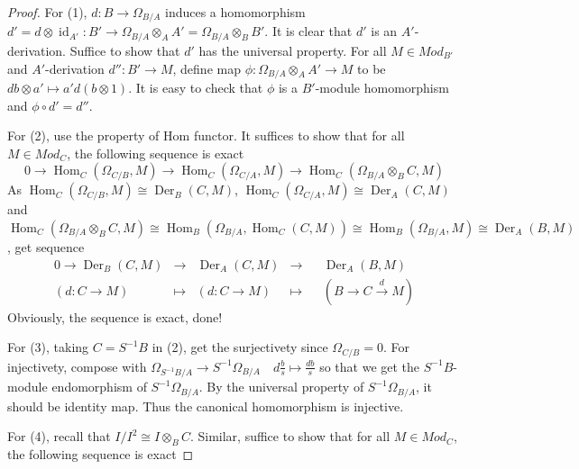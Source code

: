 \documentclass{ctexart}
\renewcommand{\hom}{\operatorname{Hom}}
\newcommand{\identity}{\operatorname{id}}
\newcommand{\derivation}{\operatorname{Der}}
\begin{document}
\begin{proof}
    For (1), $d: B \longrightarrow \Omega_{B/A}$ induces a homomorphism $d' = d \otimes \identity_{A'}: B' \longrightarrow \Omega_{B/A} \otimes_{A} A' = \Omega_{B/A} \otimes_{B} B'$.
    It is clear that $d'$ is an $A'$-derivation.
    Suffice to show that $d'$ has the universal property.
    For all $M\in Mod_{B'}$ and $A'$-derivation $d'': B' \longrightarrow M$, define map $\phi: \Omega_{B/A} \otimes_{A} A' \longrightarrow M$ to be $db \otimes a' \longmapsto a'd(b \otimes 1)$.
    It is easy to check that $\phi$ is a $B'$-module homomorphism and $\phi \circ d' = d''$.
    \par
    For (2), use the property of Hom functor.
    It suffices to show that for all $M\in Mod_{C}$, the following sequence is exact
    \begin{equation*}
        0 \longrightarrow \hom_{C}(\Omega_{C/B}, M) \longrightarrow \hom_{C}(\Omega_{C/A}, M) \longrightarrow \hom_{C}(\Omega_{B/A} \otimes_{B} C, M)
    \end{equation*}
    As $\hom_{C}(\Omega_{C/B}, M) \cong \derivation_{B}(C, M)$, $\hom_{C}(\Omega_{C/A}, M) \cong \derivation_{A}(C, M)$ and $\hom_{C}(\Omega_{B/A} \otimes_{B} C, M) \cong \hom_{B}(\Omega_{B/A}, \hom_{C}(C, M)) \cong \hom_{B}(\Omega_{B/A}, M) \cong \derivation_{A}(B, M)$, get sequence
    \begin{equation*}
        \begin{aligned}
            0 \longrightarrow \derivation_{B}(C, M) & \longrightarrow & \derivation_{A}(C, M) & \longrightarrow && \derivation_{A}(B, M) \\
            (d: C \rightarrow M) & \longmapsto & (d: C \rightarrow M) & \longmapsto && (B \rightarrow C \overset{d}{\rightarrow} M)
        \end{aligned}
    \end{equation*}
    Obviously, the sequence is exact, done!
    \par
    For (3), taking $C = S^{-1}B$ in (2), get the surjectivety since $\Omega_{C/B} = 0$.
    For injectivety, compose with $\Omega_{S^{-1}B/A} \longrightarrow S^{-1}\Omega_{B/A}\quad d\frac{b}{s} \longmapsto \frac{db}{s}$ so that we get the $S^{-1}B$-module endomorphism of $S^{-1}\Omega_{B/A}$.
    By the universal property of $S^{-1}\Omega_{B/A}$, it should be identity map.
    Thus the canonical homomorphism is injective.
    \par
    For (4), recall that $I/I^{2} \cong I \otimes_{B} C$.
    Similar, suffice to show that for all $M\in Mod_{C}$, the following sequence is exact

\end{proof}
\end{document}
